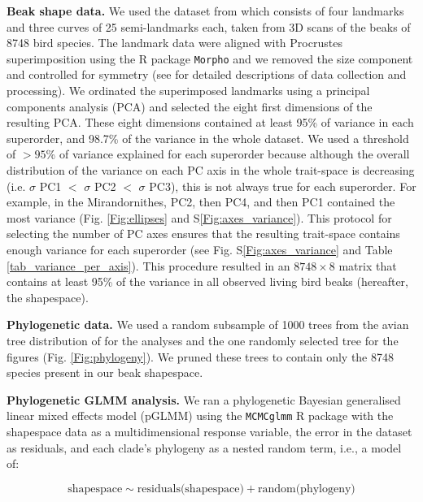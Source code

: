 \documentclass[12pt,letterpaper]{article}
\begin{document}
\textbf{Beak shape data.}
We used the dataset from \cite{cooney2017mega,chira2020signature,hughes2022global} which consists of four landmarks and three curves of 25 semi-landmarks each, taken from 3D scans of  the beaks of 8748 bird species.
The landmark data were aligned with Procrustes superimposition using the R package \texttt{Morpho} \cite{Rcore,Morpho} and we removed the size component and controlled for symmetry (see \cite{cooney2017mega,chira2020signature,hughes2022global} for detailed descriptions of data collection and processing).
We ordinated the superimposed landmarks using a principal components analysis (PCA) and selected the eight first dimensions of the resulting PCA.
These eight dimensions contained at least 95\% of variance in each superorder, and 98.7\% of the variance in the whole dataset.
We used a threshold of $>95$\% of variance explained for each superorder because although the overall distribution of the variance on each PC axis in the whole trait-space is decreasing (i.e.
$\sigma$ PC1 $<$ $\sigma$ PC2 $<$ $\sigma$ PC3), this is not always true for each superorder.
For example, in the Mirandornithes, PC2, then PC4, and then PC1 contained the most variance (Fig. \ref{Fig:ellipses} and S\ref{Fig:axes_variance}).
This protocol for selecting the number of PC axes ensures that the resulting trait-space contains enough variance for each superorder (see Fig. S\ref{Fig:axes_variance} and Table \ref{tab_variance_per_axis}).
This procedure resulted in an $8748 \times 8$ matrix that contains at least 95\% of the variance in all observed living bird beaks (hereafter, the shapespace).

\textbf{Phylogenetic data.}
We used a random subsample of 1000 trees from the avian tree distribution of \cite{jetz2012global} for the analyses and the one randomly selected tree for the figures (Fig. \ref{Fig:phylogeny}).
We pruned these trees to contain only the 8748 species present in our beak shapespace.




\textbf{Phylogenetic GLMM analysis.}
We ran a phylogenetic Bayesian generalised linear mixed effects model (pGLMM) using the \texttt{MCMCglmm} R package \cite{MCMCglmm} with the shapespace data as a multidimensional response variable, the error in the dataset as residuals, and each clade's phylogeny as a nested random term, i.e., a model of:

\begin{equation}
\text{shapespace} \mathtt{\sim} \text{residuals(shapespace)} + \text{random(phylogeny)}
\end{equation}
\end{document}
